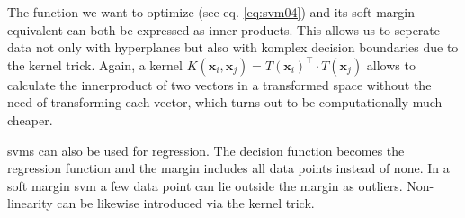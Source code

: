 The function we want to optimize (see eq. \ref{eq:svm04}) and its soft margin equivalent can both be expressed as inner products. 
This allows us to seperate data not only with hyperplanes 
but also with komplex decision boundaries due to the kernel trick. 
Again, a kernel $K(\mathbf{x}_i, \mathbf{x}_j) = T(\mathbf{x}_i)^\top \cdot T(\mathbf{x}_j)$ allows to calculate the innerproduct of two vectors in a transformed space without the need of transforming each vector, which turns out to be computationally much cheaper. 

\Gls{svm}s can also be used for regression.
The decision function becomes the regression function and the margin includes all data points instead of none. 
In a soft margin \gls{svm} a few data point can lie outside the margin as outliers. 
Non-linearity can be likewise introduced via the kernel trick. 

